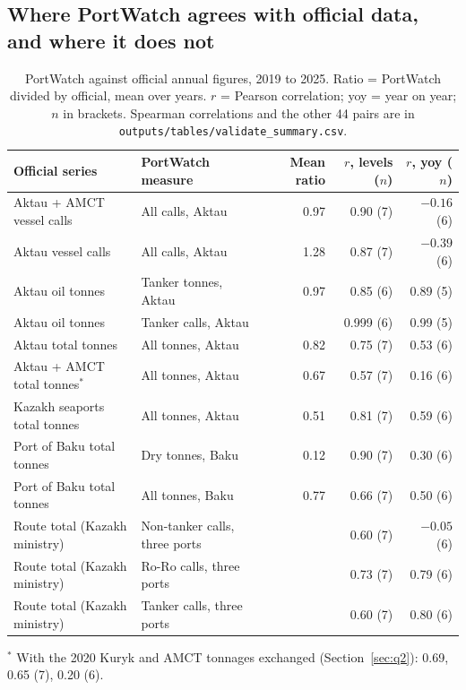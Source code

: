 \documentclass[11pt,a4paper]{article}
\begin{document}
\subsection{Where PortWatch agrees with official data, and where it does not}

\begin{table}[tbp]
\centering\small
\caption{PortWatch against official annual figures, 2019 to 2025. Ratio = PortWatch divided by official, mean over years. $r$ = Pearson correlation; yoy = year on year; $n$ in brackets. Spearman correlations and the other 44 pairs are in \texttt{outputs/tables/validate\_summary.csv}.}
\label{tab:validation}
\footnotesize
\begin{tabular}{llrrr}
\toprule
Official series & PortWatch measure & Mean ratio & $r$, levels ($n$) & $r$, yoy ($n$) \\
\midrule
Aktau + AMCT vessel calls & All calls, Aktau & 0.97 & 0.90 (7) & $-0.16$ (6) \\
Aktau vessel calls & All calls, Aktau & 1.28 & 0.87 (7) & $-0.39$ (6) \\
Aktau oil tonnes & Tanker tonnes, Aktau & 0.97 & 0.85 (6) & 0.89 (5) \\
Aktau oil tonnes & Tanker calls, Aktau & & 0.999 (6) & 0.99 (5) \\
Aktau total tonnes & All tonnes, Aktau & 0.82 & 0.75 (7) & 0.53 (6) \\
Aktau + AMCT total tonnes$^{*}$ & All tonnes, Aktau & 0.67 & 0.57 (7) & 0.16 (6) \\
Kazakh seaports total tonnes & All tonnes, Aktau & 0.51 & 0.81 (7) & 0.59 (6) \\
Port of Baku total tonnes & Dry tonnes, Baku & 0.12 & 0.90 (7) & 0.30 (6) \\
Port of Baku total tonnes & All tonnes, Baku & 0.77 & 0.66 (7) & 0.50 (6) \\
Route total (Kazakh ministry) & Non-tanker calls, three ports & & 0.60 (7) & $-0.05$ (6) \\
Route total (Kazakh ministry) & Ro-Ro calls, three ports & & 0.73 (7) & 0.79 (6) \\
Route total (Kazakh ministry) & Tanker calls, three ports & & 0.60 (7) & 0.80 (6) \\
\bottomrule
\end{tabular}

\smallskip
\footnotesize $^{*}$ With the 2020 Kuryk and AMCT tonnages exchanged (Section~\ref{sec:q2}): 0.69, 0.65 (7), 0.20 (6).
\end{table}
\end{document}

